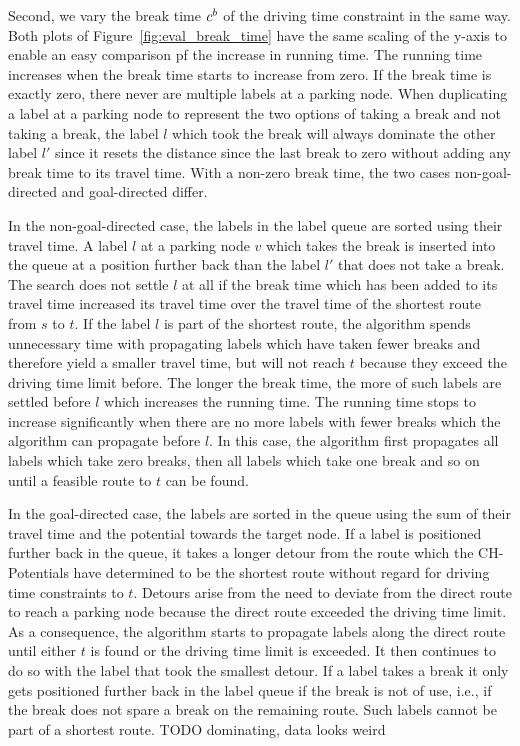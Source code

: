Second, we vary the break time $c^b$ of the driving time constraint in the same way. Both plots of Figure~\ref{fig:eval_break_time} have the same scaling of the y-axis to enable an easy comparison pf the increase in running time. The running time increases when the break time starts to increase from zero. If the break time is exactly zero, there never are multiple labels at a parking node. When duplicating a label at a parking node to represent the two options of taking a break and not taking a break, the label $l$ which took the break will always dominate the other label $l'$ since it resets the distance since the last break to zero without adding any break time to its travel time. With a non-zero break time, the two cases non-goal-directed and goal-directed differ.

In the non-goal-directed case, the labels in the label queue are sorted using their travel time. A label $l$ at a parking node $v$ which takes the break is inserted into the queue at a position further back than the label $l'$ that does not take a break. The search does not settle $l$ at all if the break time which has been added to its travel time increased its travel time over the travel time of the shortest route from $s$ to $t$. If the label $l$ is part of the shortest route, the algorithm spends unnecessary time with propagating labels which have taken fewer breaks and therefore yield a smaller travel time, but will not reach $t$ because they exceed the driving time limit before. The longer the break time, the more of such labels are settled before $l$ which increases the running time. The running time stops to increase significantly when there are no more labels with fewer breaks which the algorithm can propagate before $l$. In this case, the algorithm first propagates all labels which take zero breaks, then all labels which take one break and so on until a feasible route to $t$ can be found.

In the goal-directed case, the labels are sorted in the queue using the sum of their travel time and the potential towards the target node. If a label is positioned further back in the queue, it takes a longer detour from the route which the CH-Potentials have determined to be the shortest route without regard for driving time constraints to $t$. Detours arise from the need to deviate from the direct route to reach a parking node because the direct route exceeded the driving time limit. As a consequence, the algorithm starts to propagate labels along the direct route until either $t$ is found or the driving time limit is exceeded. It then continues to do so with the label that took the smallest detour. If a label takes a break it only gets positioned further back in the label queue if the break is not of use, i.e., if the break does not spare a break on the remaining route. Such labels cannot be part of a shortest route. TODO dominating, data looks weird

